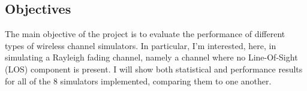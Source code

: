 \subsection{Objectives} %
\label{subsec:objectives}

The main objective of the project is to evaluate the performance of different types of wireless channel simulators. In particular, I'm interested, here, in simulating a Rayleigh fading channel, namely a channel where no Line-Of-Sight (LOS) component is present. I will show both statistical and performance results for all of the 8 simulators implemented, comparing them to one another.